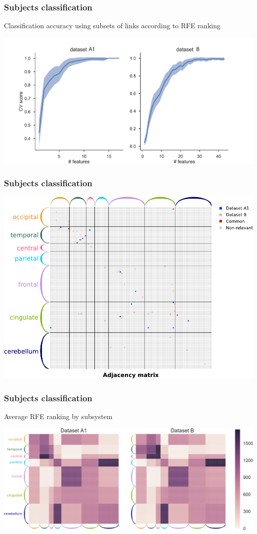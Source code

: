 \documentclass[final]{beamer}
\begin{document}
\begin{frame}
\frametitle{Subjects classification}
Classification accuracy using subsets of links according to RFE ranking
\begin{center}
\includegraphics[width=0.8\columnwidth]{subj_varying_links}
\end{center}
\end{frame}

\begin{frame}
\frametitle{Subjects classification}
\begin{center}
\includegraphics[width=0.9\columnwidth]{subj_net}
\end{center}
\end{frame}

\begin{frame}
\frametitle{Subjects classification}
Average RFE ranking by subsystem
\begin{center}
\includegraphics[width=0.9\columnwidth]{avg_ranking_subsystems}
\end{center}
\end{frame}
\end{document}
